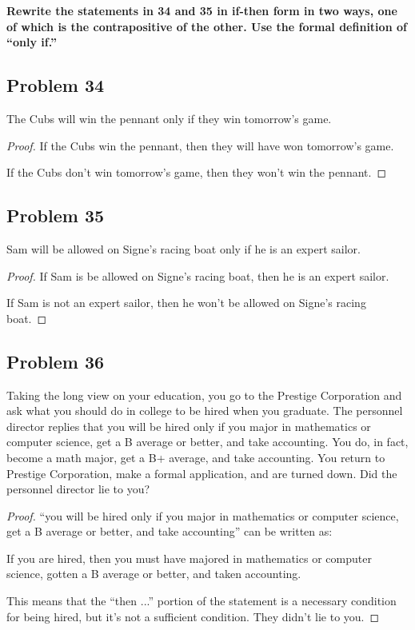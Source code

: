 \documentclass[14pt]{extarticle}
\begin{document}
{\bf Rewrite the statements in 34 and 35 in if-then form in two ways, one of which is the contrapositive of the other. Use the formal definition of “only if.”}

\subsection{Problem 34}
The Cubs will win the pennant only if they win tomorrow’s game.

\begin{proof}
If the Cubs win the pennant, then they will have won tomorrow’s game.

If the Cubs don't win tomorrow's game, then they won't win the pennant.
\end{proof}

\subsection{Problem 35}
Sam will be allowed on Signe’s racing boat only if he is an expert sailor.

\begin{proof}
If Sam is be allowed on Signe’s racing boat, then he is an expert sailor.

If Sam is not an expert sailor, then he won't be allowed on Signe’s racing boat.
\end{proof}

\subsection{Problem 36}
Taking the long view on your education, you go to the Prestige Corporation and ask what you should do in college to be hired when you graduate. The personnel director replies that you will be hired only if you major in mathematics or computer science, get a B average or better, and take accounting. You do, in fact, become a math major, get a B+ average, and take accounting. You return to Prestige Corporation, make a formal application, and are turned down. Did the personnel director lie to you?

\begin{proof}
``you will be hired only if you major in mathematics or computer science, get a B average or better, and take accounting'' can be written as:

If you are hired, then you must have majored in mathematics or computer science, gotten a B average or better, and taken accounting.

This means that the ``then ...'' portion of the statement is a necessary condition for being hired, but it's not a sufficient condition. They didn't lie to you.
\end{proof}
\end{document}
